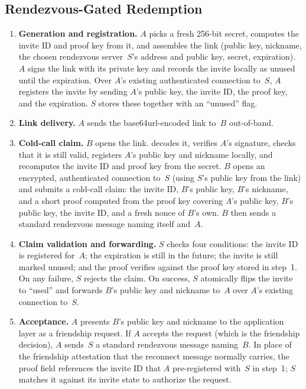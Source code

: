 \subsection{Rendezvous-Gated Redemption}
\label{appendix:rv-invite-redemption}

\begin{enumerate}
\item \textbf{Generation and registration.}  $A$ picks a fresh 256-bit secret, computes the invite ID and proof key from it, and assembles the link (public key, nickname, the chosen rendezvous server~$S$'s address and public key, secret, expiration).  $A$ signs the link with its private key and records the invite locally as unused until the expiration.  Over $A$'s existing authenticated connection to~$S$, $A$ registers the invite by sending $A$'s public key, the invite ID, the proof key, and the expiration.  $S$ stores these together with an ``unused'' flag.

\item \textbf{Link delivery.}  $A$ sends the base64url-encoded link to~$B$ out-of-band.

\item \textbf{Cold-call claim.}  $B$ opens the link.   decodes it, verifies $A$'s signature, checks that it is still valid, registers $A$'s public key and nickname locally, and recomputes the invite ID and proof key from the secret.  $B$ opens an encrypted, authenticated connection to~$S$ (using $S$'s public key from the link) and submits a cold-call claim: the invite ID, $B$'s public key, $B$'s nickname, and a short proof computed from the proof key covering $A$'s public key, $B$'s public key, the invite ID, and a fresh nonce of $B$'s own.  $B$ then sends a standard rendezvous  message naming itself and~$A$.

\item \textbf{Claim validation and forwarding.}  $S$ checks four conditions: the invite ID is registered for~$A$; the expiration is still in the future; the invite is still marked unused; and the proof verifies against the proof key stored in step~1.  On any failure, $S$ rejects the claim.  On success, $S$ atomically flips the invite to ``used'' and forwards $B$'s public key and nickname to~$A$ over $A$'s existing connection to~$S$.

\item \textbf{Acceptance.}  $A$ presents $B$'s public key and nickname to the application layer as a friendship request.  If $A$ accepts the request (which is the friendship decision), $A$ sends~$S$ a standard rendezvous  message naming~$B$.  In place of the friendship attestation that the reconnect message normally carries, the proof field references the invite ID that $A$ pre-registered with~$S$ in step~1; $S$ matches it against its invite state to authorize the request.


\end{enumerate}
